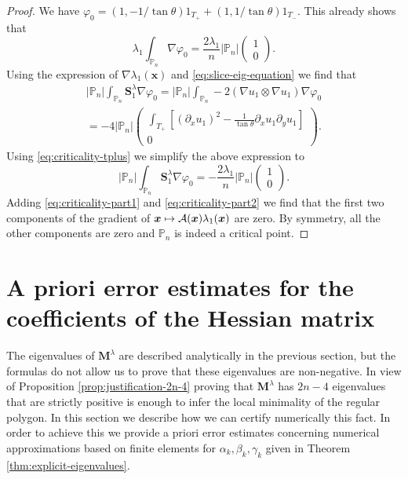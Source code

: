 \documentclass[JEP,XML,SOM,Unicode,ThmDefs,NoFloatCountersInSection,published]{cedram}
\def\mto{\mathchoice{\longmapsto}{\mapsto}{\mapsto}{\mapsto}}
\theoremstyle{plain}
\theoremstyle{definition}
\newcommand{\bo}[1]{{\boldsymbol#1}}
\let\Bbb\mathbb
\begin{document}
\begin{proof}
We have $\varphi_0 = (1,-1/\tan\theta)1_{T_+}+(1,1/\tan\theta)1_{T_-}$. This already shows that
\begin{equation}\lambda_1 \int_{\Bbb P_n} \nabla \varphi_0 = \frac{2\lambda_1}{n} |\Bbb P_n| \begin{pmatrix}
1\\ 0
\end{pmatrix}.
\label{eq:criticality-part1}
\end{equation}
Using the expression of $\nabla \lambda_1(\bo x)$ and \eqref{eq:slice-eig-equation} we find that
\vspace*{-5pt}
\begin{multline*}
|\Bbb P_n| \int_{\Bbb P_n} \bo S_1^\lambda \nabla \varphi_0 = |\Bbb P_n| \int_{\Bbb P_n} -2(\nabla u_1\otimes \nabla u_1)\nabla \varphi_0 \\
= -4|\Bbb P_n| \begin{pmatrix}
\int_{T_+} [(\partial_x u_1)^2-\frac{1}{\tan \theta} \partial_x u_1 \partial_y u_1]\\
0
\end{pmatrix}.
\end{multline*}
Using \eqref{eq:criticality-tplus} we simplify the above expression to
\begin{equation} |\Bbb P_n| \int_{\Bbb P_n} \bo S_1^\lambda \nabla \varphi_0 = -\frac{2\lambda_1}{n}|\Bbb P_n| \begin{pmatrix} 1\\ 0
\end{pmatrix}.
\label{eq:criticality-part2}
\end{equation}
Adding \eqref{eq:criticality-part1} and \eqref{eq:criticality-part2} we find that the first two components of the gradient of $\bo x \mto \mathcal A(\bo x)\lambda_1(\bo x)$ are zero. By symmetry, all the other components are zero and $\Bbb P_n$ is indeed a critical point.
\end{proof}

\section{A priori error estimates for the coefficients of the Hessian matrix}\label{bobu200.s5}

The eigenvalues of $\bo M^\lambda$ are described analytically in the previous section, but the formulas do not allow us to prove that these eigenvalues are non-negative. In view of Proposition \ref{prop:justification-2n-4} proving that $\bo M^\lambda$ has $2n-4$ eigenvalues that are strictly positive is enough to infer the local minimality of the regular polygon. In this section we describe how we can certify numerically this fact. In order to achieve this we provide a priori error estimates concerning numerical approximations based on finite elements for $\alpha_k,\beta_k,\gamma_k$ given in Theorem \ref{thm:explicit-eigenvalues}.
\end{document}
